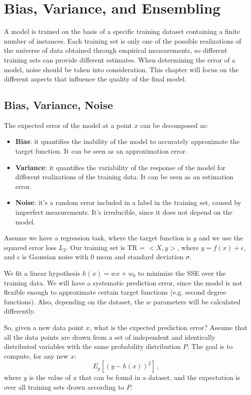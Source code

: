 \chapter{Bias, Variance, and Ensembling}

A model is trained on the basis of a specific training dataset containing a finite number of instances. Each training set is only one of the possible realizations of the universe of data obtained through empirical measurements, so different training sets can provide different estimates. When determining the error of a model, noise should be taken into consideration. This chapter will focus on the different aspects that influence the quality of the final model.

\section{Bias, Variance, Noise}

The expected error of the model at a point $x$ can be decomposed as:
\begin{itemize}
    \item \textbf{Bias}: it quantifies the inability of the model to accurately approximate the target function. It can be seen as an approximation error.

    \item \textbf{Variance}: it quantifies the variability of the response of the model for different realizations of the training data. It can be seen as an estimation error.

    \item \textbf{Noise}: it's a random error included in a label in the training set, caused by imperfect measurements. It's irreducible, since it does not depend on the model.
\end{itemize}

Assume we have a regression task, where the target function is $y$ and we use the squared error loss $L_2$. Our training set is TR = $< X, y >$, where $y = f(x) + \epsilon$, and $\epsilon$ is Gaussian noise with 0 mean and standard deviation $\sigma$.

We fit a linear hypothesis $h(x) = wx + w_0$ to minimize the SSE over the training data. We will have a systematic prediction error, since the model is not flexible enough to approximate certain target functions (e.g. second degree functions). Also, depending on the dataset, the $w$ parameters will be calculated differently.

So, given a new data point $x$, what is the expected prediction error? Assume that all the data points are drawn from a set of independent and identically distributed variables with the same probability distribution $P$. The goal is to compute, for any new $x$:
\begin{equation*}
    E_p [(y-h(x))^2] \,,
\end{equation*}
where $y$ is the value of $x$ that can be found in a dataset, and the expectation is over all training sets drawn according to $P$.

